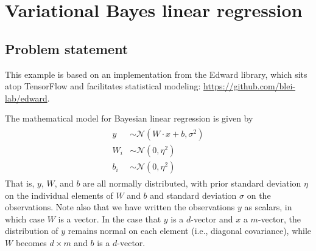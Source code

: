 \documentclass[10pt]{article}
\begin{document}
\section{Variational Bayes linear regression}
\subsection{Problem statement}
This example is based on an implementation from the Edward library, which sits atop TensorFlow and facilitates statistical modeling: \url{https://github.com/blei-lab/edward}.

The mathematical model for Bayesian linear regression is given by
\begin{align}
    \label{pmodel}
    \begin{split}
        y &\sim \mathcal{N}(W \cdot x + b, \sigma^2) \\
        W_i &\sim \mathcal{N}(0, \eta^2) \\
        b_i &\sim \mathcal{N}(0, \eta^2)
    \end{split}
\end{align}
That is, $y$, $W$, and $b$ are all normally distributed, with prior standard deviation $\eta$ on the individual elements of $W$ and $b$ and standard deviation $\sigma$ on the observations. Note also that we have written the observations $y$ as scalars, in which case $W$ is a vector. In the case that $y$ is a $d$-vector and $x$ a $m$-vector, the distribution of $y$ remains normal on each element (i.e., diagonal covariance), while $W$ becomes $d \times m$ and $b$ is a $d$-vector.
\end{document}

